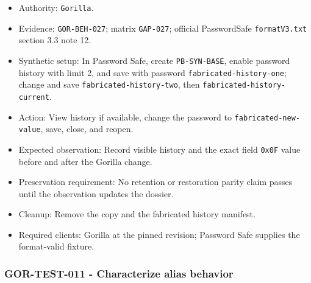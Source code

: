 \documentclass[
  letterpaper,
]{article}
\newcommand{\passthrough}[1]{#1}
\providecommand{\tightlist}{%
  \setlength{\itemsep}{0pt}\setlength{\parskip}{0pt}}
\begin{document}
\begin{itemize}
\tightlist
\item
  Authority: \passthrough{\lstinline!Gorilla!}.
\item
  Evidence: \nolinkurl{GOR-BEH-027}; matrix \passthrough{\lstinline!GAP-027!}; official PasswordSafe
  \nolinkurl{formatV3.txt} section 3.3 note 12.
\item
  Synthetic setup: In Password Safe, create \nolinkurl{PB-SYN-BASE}, enable password history with limit 2, and save with
  password \nolinkurl{fabricated-history-one}; change and save \nolinkurl{fabricated-history-two}, then
  \nolinkurl{fabricated-history-current}.
\item
  Action: View history if available, change the password to \nolinkurl{fabricated-new-value}, save, close, and reopen.
\item
  Expected observation: Record visible history and the exact field \passthrough{\lstinline!0x0F!} value before and after
  the Gorilla change.
\item
  Preservation requirement: No retention or restoration parity claim passes until the observation updates the dossier.
\item
  Cleanup: Remove the copy and the fabricated history manifest.
\item
  Required clients: Gorilla at the pinned revision; Password Safe supplies the format-valid fixture.
\end{itemize}

\subsubsection{GOR-TEST-011 - Characterize alias behavior}\label{gor-test-011---characterize-alias-behavior}
\end{document}
